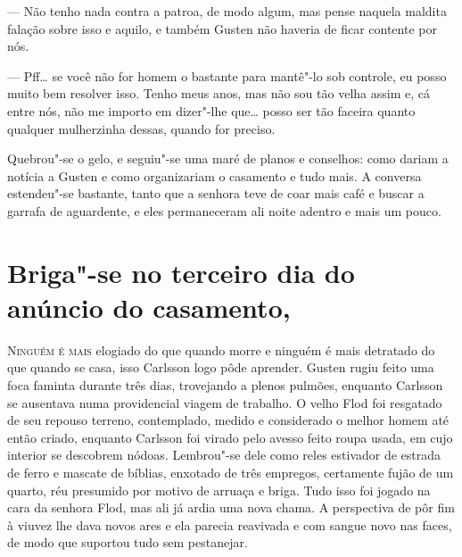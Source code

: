 --- Não tenho nada contra a patroa, de modo algum, mas pense naquela maldita falação
sobre isso e aquilo, e também Gusten não haveria de ficar contente por nós.

--- Pff\ldots{} se você não for homem o bastante para mantê"-lo sob controle, eu posso muito bem resolver
isso. Tenho meus anos, mas não sou tão velha assim e, cá entre nós, não me importo em dizer"-lhe que\ldots{}
posso ser tão faceira quanto qualquer mulherzinha dessas, quando for preciso.

Quebrou"-se o gelo, e seguiu"-se uma maré de planos e conselhos: como dariam
a notícia a Gusten e como organizariam o casamento e tudo mais. A
conversa estendeu"-se bastante, tanto que a senhora teve de coar mais café e
buscar a garrafa de aguardente, e eles permaneceram ali noite adentro e mais um pouco.

\chapter[Briga"-se no terceiro dia do anúncio\ldots]{Briga"-se no terceiro dia do
anúncio do casamento, }

\textsc{Ninguém é mais} elogiado do que quando morre e ninguém é mais detratado
do que quando se casa, isso Carlsson logo pôde aprender. Gusten rugiu feito uma foca
faminta durante três dias, trovejando a plenos pulmões, enquanto Carlsson se
ausentava numa providencial viagem de trabalho. O velho Flod foi
resgatado de seu repouso terreno, contemplado, medido e considerado o melhor
homem até então criado, enquanto Carlsson foi virado pelo avesso feito roupa usada, em
cujo interior se descobrem nódoas. Lembrou"-se dele como reles
estivador de estrada de ferro e mascate de bíblias, enxotado de três empregos,
certamente fujão de um quarto, réu presumido por motivo de arruaça e briga. Tudo
isso foi jogado na cara da senhora Flod, mas ali já ardia uma nova chama. A
perspectiva de pôr fim à viuvez lhe dava novos ares e ela parecia reavivada e
com sangue novo nas faces, de modo que suportou tudo sem pestanejar.

